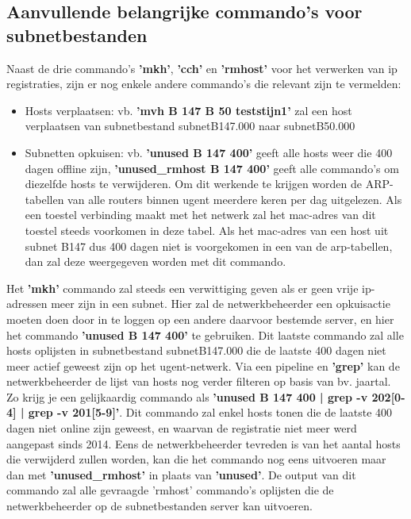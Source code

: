 \subsection{Aanvullende belangrijke commando's voor subnetbestanden}
Naast de drie commando's \textbf{'mkh'}, \textbf{'cch'} en \textbf{'rmhost'} voor het verwerken van \acrshort{ip} registraties, zijn er nog enkele andere commando's die relevant zijn te vermelden:

\begin{itemize}
    \item Hosts verplaatsen: vb. \textbf{'mvh B 147 B 50 teststijn1'} zal een host verplaatsen van subnetbestand subnetB147.000 naar subnetB50.000 
    \item Subnetten opkuisen: vb. \textbf{'unused B 147 400'} geeft alle hosts weer die 400 dagen offline zijn, \textbf{'unused\_rmhost B 147 400'} geeft alle commando's om diezelfde hosts te verwijderen. Om dit werkende te krijgen worden de \acrshort{ARP}-tabellen van alle routers binnen \acrshort{ugent} meerdere keren per dag uitgelezen. Als een toestel verbinding maakt met het netwerk zal het \acrshort{mac}-adres van dit toestel steeds voorkomen in deze tabel. Als het \acrshort{mac}-adres van een host uit subnet B147 dus 400 dagen niet is voorgekomen in een van de \acrshort{arp}-tabellen, dan zal deze weergegeven worden met dit commando.
\end{itemize}


Het \textbf{'mkh'} commando zal steeds een verwittiging geven als er geen vrije \acrshort{ip}-adressen meer zijn in een subnet. Hier zal de netwerkbeheerder een opkuisactie moeten doen door in te loggen op een andere daarvoor bestemde server, en hier het commando \textbf{'unused B 147 400'} te gebruiken. Dit laatste commando zal alle hosts oplijsten in subnetbestand subnetB147.000 die de laatste 400 dagen niet meer actief geweest zijn op het \acrshort{ugent}-netwerk. Via een pipeline en \textbf{'grep'} kan de netwerkbeheerder de lijst van hosts nog verder filteren op basis van bv. jaartal. Zo krijg je een gelijkaardig commando als \textbf{'unused B 147 400 | grep -v 202[0-4] | grep -v 201[5-9]'}. 
Dit commando zal enkel hosts tonen die de laatste 400 dagen niet online zijn geweest, en waarvan de registratie niet meer werd aangepast sinds 2014. Eens de netwerkbeheerder tevreden is van het aantal hosts die verwijderd zullen worden, kan die het commando nog eens uitvoeren maar dan met \textbf{'unused\_rmhost'} in plaats van \textbf{'unused'}. De output van dit commando zal alle gevraagde 'rmhost' commando's oplijsten die de netwerkbeheerder op de subnetbestanden server kan uitvoeren.

